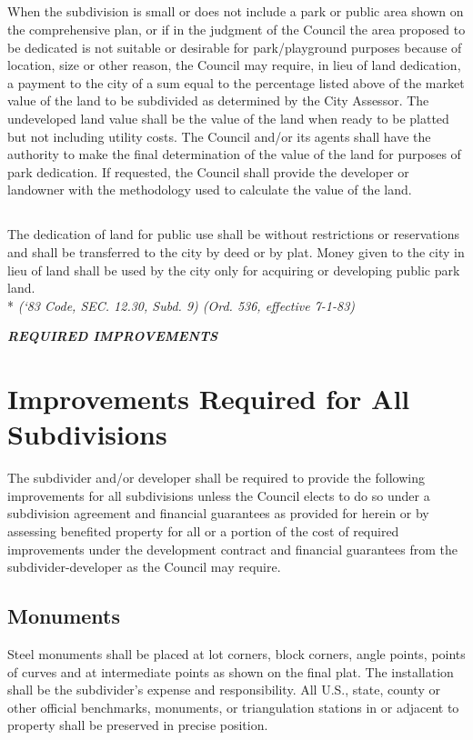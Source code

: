 \subsection{}
When the subdivision is small or does not include a park or public area shown on the comprehensive plan, or if in the judgment of the Council the area proposed to be dedicated is not suitable or desirable for park/playground purposes because of location, size or other reason, the Council may require, in lieu of land dedication, a payment to the city of a sum equal to the percentage listed above of the market value of the land to be subdivided as determined by the City Assessor. The undeveloped land value shall be the value of the land when ready to be platted but not including utility costs. The Council and/or its agents shall have the authority to make the final determination of the value of the land for purposes of park dedication. If requested, the Council shall provide the developer or landowner with the methodology used to calculate the value of the land.
\subsection{}
The dedication of land for public use shall be without restrictions or reservations and shall be transferred to the city by deed or by plat. Money given to the city in lieu of land shall be used by the city only for acquiring or developing public park land.\\*
\emph{(‘83 Code, SEC. 12.30, Subd. 9)  (Ord. 536, effective 7-1-83)}\\


\begin{center}
    \emph{\textbf{\LARGE{REQUIRED IMPROVEMENTS}}}
\end{center}

\setcounter{section}{49}
\section{Improvements Required for All Subdivisions}
The subdivider and/or developer shall be required to provide the following improvements for all subdivisions unless the Council elects to do so under a subdivision agreement and financial guarantees as provided for herein or by assessing benefited property for all or a portion of the cost of required improvements under the development contract and financial guarantees from the subdivider-developer as the Council may require.
\subsection{Monuments}
Steel monuments shall be placed at lot corners, block corners, angle points, points of curves and at intermediate points as shown on the final plat. The installation shall be the subdivider’s expense and responsibility. All U.S., state, county or other official benchmarks, monuments, or triangulation stations in or adjacent to property shall be preserved in precise position.
